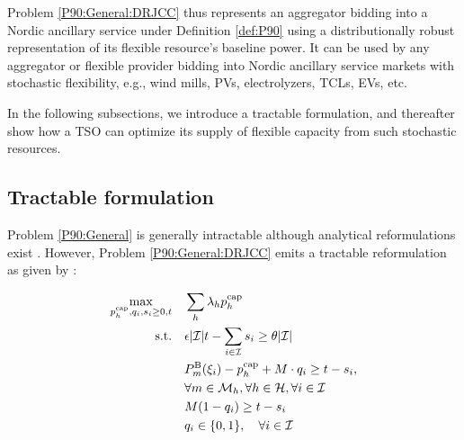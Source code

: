 \documentclass[conference]{IEEEtran}
\begin{document}
Problem \eqref{P90:General:DRJCC} thus represents an aggregator bidding into a Nordic ancillary service under Definition \ref{def:P90} using a distributionally robust representation of its flexible resource's baseline power. It can be used by any aggregator or flexible provider bidding into Nordic ancillary service markets with stochastic flexibility, e.g., wind mills, \acp{PV}, electrolyzers, \acp{TCL}, \acp{EV}, etc.

In the following subsections, we introduce a tractable formulation, and thereafter show how a \ac{TSO} can optimize its supply of flexible capacity from such stochastic resources.


\subsection{Tractable formulation}

Problem \eqref{P90:General} is generally intractable although analytical reformulations exist \cite{nemirovski2007convex}. However, Problem \eqref{P90:General:DRJCC} emits a tractable reformulation as given by \cite[Proposition 2]{chen2022data}:

\begin{subequations}\label{P90:General:DRJCC-tract}
    \begin{align}
        \max_{p_{h}^{\text{cap}}, q_i, s_i \geq 0, t} \quad & \sum_h \lambda_h p_{h}^{\text{cap}}                                                                                                                                    \\
        \text{s.t.} \quad                                   & \epsilon |\mathcal{I}| t - \sum_{i \in \mathcal{I}} s_i \geq \theta |\mathcal{I}|                                                                                      \\
                                                            & P_{m}^{\text{B}}(\xi_i) - p_{h}^{\text{cap}} + M\cdot q_i \geq t - s_i, \notag \\
                                                            &  \forall{m} \in \mathcal{M}_{h},  \forall{h} \in \mathcal{H},  \forall{i} \in \mathcal{I} \\
                                                            & M (1-q_i) \geq t - s_i                                                                                                                                                 \\
                                                            & q_i \in \{0,1 \}, \quad \forall{i} \in \mathcal{I}
    \end{align}
\end{subequations}
\end{document}

